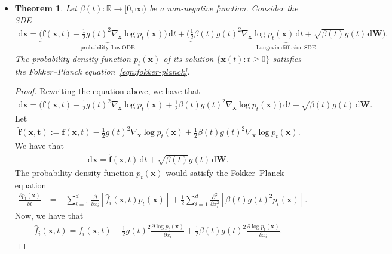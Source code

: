 \documentclass[10pt]{article}
\newtheorem{theorem}[lemma]{Theorem}
\newcommand{\dee}{\mathrm{d}}
\newcommand{\ve}[1]{\mathbf{#1}}
\newcommand{\Real}{\mathbb{R}}
\begin{document}
\begin{itemize}
  \item \begin{theorem} \label{thm:generalized-diffusion-sde}
    Let $\beta(t): \Real \rightarrow [0,\infty)$ be a non-negative function. Consider the SDE
    \begin{align}
      \dee\ve{x} = \underbrace{\bigg( \ve{f}(\ve{x},t) - \frac{1}{2}g(t)^2 \nabla_{\ve{x}} \log p_t(\ve{x}) \bigg)\, \dee t}_{\mathrm{probability\ flow\ ODE}} +  \bigg( \underbrace{\frac{1}{2} \beta(t) g(t)^2 \nabla_{\ve{x}} \log p_t(\ve{x})\, \dee t + \sqrt{\beta(t)} g(t)\, \dee \ve{W}}_{\mathrm{Langevin\ diffusion\ SDE}} \bigg).
    \end{align}
    The probability density function $p_t(\ve{x})$ of its solution $\{ \ve{x}(t): t \geq 0 \}$ satisfies the Fokker--Planck equation~\eqref{eqn:fokker-planck}.
  \end{theorem}
  \begin{proof}
    Rewriting the equation above, we have that
    \begin{align*}
      \dee \ve{x} = \bigg( \ve{f}(\ve{x},t) - \frac{1}{2}g(t)^2 \nabla_{\ve{x}} \log p_t(\ve{x}) + \frac{1}{2} \beta(t) g(t)^2 \nabla_{\ve{x}} \log p_t(\ve{x}) \bigg)\, \dee t + \sqrt{\beta(t)} g(t)\, \dee \ve{W}.
    \end{align*}
    Let
    \begin{align*}
      \hat{\ve{f}}(\ve{x,t}) := \ve{f}(\ve{x},t) - \frac{1}{2}g(t)^2 \nabla_{\ve{x}} \log p_t(\ve{x})  + \frac{1}{2} \beta(t) g(t)^2 \nabla_{\ve{x}} \log p_t(\ve{x}).
    \end{align*}
    We have that
    \begin{align*}
      \dee \ve{x} = \hat{\ve{f}}(\ve{x},t)\, \dee t + \sqrt{\beta(t)}g(t)\, \dee \ve{W}.
    \end{align*}
    The probability density function $p_t(\ve{x})$ would satisfy the Fokker--Planck equation
    \begin{align*}
      \frac{\partial p_t(\ve{x})}{\partial t} 
      &= - \sum_{i=1}^d \frac{\partial}{\partial x_i}[\hat{f}_i(\ve{x},t) p_t(\ve{x})] + \frac{1}{2} \sum_{i=1}^d \frac{\partial^2}{\partial x_i^2} [\beta(t) g(t)^2 p_t(\ve{x})].      
    \end{align*}
    Now, we have that
    \begin{align*}
      \hat{f}_i(\ve{x},t) = f_i(\ve{x},t) - \frac{1}{2}g(t)^2 \frac{\partial \log p_t(\ve{x})}{\partial x_i} + \frac{1}{2}\beta(t) g(t)^2 \frac{\partial \log p_t(\ve{x})}{\partial x_i}.
    \end{align*}

\end{proof}
\end{itemize}
\end{document}

